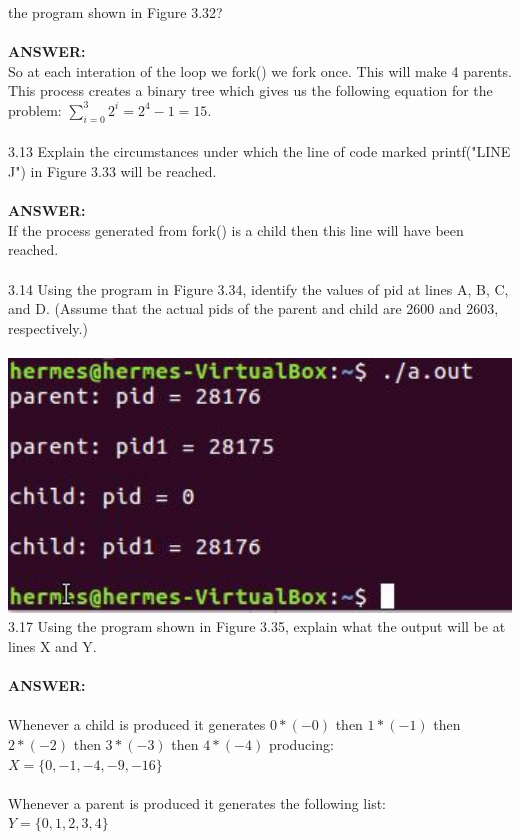 \documentclass[12pt]{article}
\begin{document}
the program shown in Figure 3.32?\\\\
\textbf{ANSWER: }\\
So at each interation of the loop we fork() we fork once. This will make 4
parents. This process creates a binary tree which gives us the following 
equation for the problem: $\sum\limits_{i=0}^{3}{2^i}=2^4-1=15$. \\\\
3.13 Explain the circumstances under which the line of code marked
printf("LINE J") in Figure 3.33 will be reached.\\\\
\textbf{ANSWER: }\\
If the process generated from fork() is a child then this line will have been 
reached.\\\\
3.14 Using the program in Figure 3.34, identify the values of pid at lines A, B,
C, and D. (Assume that the actual pids of the parent and child are 2600
and 2603, respectively.)\\\\
\includegraphics[width=1\textwidth]{q_pi.jpg}\\
3.17 Using the program shown in Figure 3.35, explain what the output will
be at lines X and Y.\\\\
\textbf{ANSWER: }\\\\
Whenever a child is produced it generates $0*(-0)$ then $1*(-1)$ then $2*(-2)$ 
then $3*(-3)$ then $4*(-4)$ producing:\\ 
$X = \{0, -1, -4, -9, -16\}$\\\\
Whenever a parent is produced it generates the following list:\\
$Y = \{0, 1, 2, 3, 4\}$\\
\end{document}
